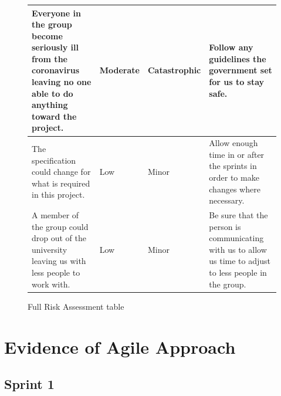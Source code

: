 \documentclass[10pt, notitlepage]{report}
\begin{document}
\begin{figure}[!h]
\begin{longtable}{| p{5.5cm} | p{2cm} | p{2cm} |  p{5.5cm} |}
Everyone in the group become seriously ill from the coronavirus leaving no one able to do anything toward the project.&
Moderate&
Catastrophic&
Follow any guidelines the government set for us to stay safe.\\
\hline

The specification could change for what is required in this project.& 
Low&
Minor&
Allow enough time in or after the sprints in order to make changes where necessary.\\
\hline

A member of the group could drop out of the university leaving us with less people to work with.& 
Low&
Minor&
Be sure that the person is communicating with us to allow us time to adjust to less people in the group.\\
\hline


\end{longtable}

\caption{Full Risk Assessment table}
\label{fig:risks}

\end{figure}

\newpage

\section{Evidence of Agile Approach}
\label{sec:agileapp}

\subsection{Sprint 1}
\end{document}
